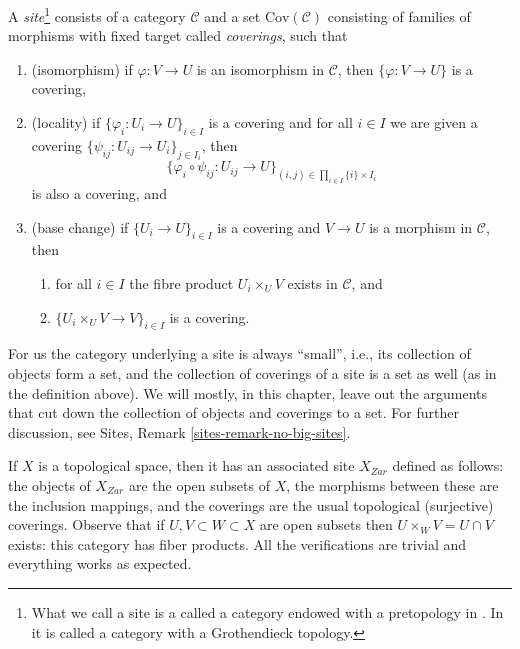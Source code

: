 \begin{definition}
\label{definition-site}
A {\it site}\footnote{What we call a site is a called a category endowed with
a pretopology in \cite[Expos\'e II, D\'efinition 1.3]{SGA4}.
In \cite{ArtinTopologies} it is called a category with a Grothendieck
topology.} consists of a category $\mathcal{C}$ and a set
$\text{Cov}(\mathcal{C})$ consisting of families of morphisms with fixed target
called {\it coverings}, such that
\begin{enumerate}
\item (isomorphism) if $\varphi : V \to U$ is an isomorphism in $\mathcal{C}$,
then $\{\varphi : V \to U\}$ is a covering,
\item (locality) if $\{\varphi_i : U_i \to U\}_{i\in I}$ is a covering and
for all $i \in I$ we are given a covering
$\{\psi_{ij} : U_{ij} \to U_i \}_{j\in I_i}$, then
$$
\{
\varphi_i \circ \psi_{ij} : U_{ij} \to U
\}_{(i, j)\in \prod_{i\in I} \{i\} \times I_i}
$$
is also a covering, and
\item (base change) if $\{U_i \to U\}_{i\in I}$
is a covering and $V \to U$ is a morphism in $\mathcal{C}$, then
\begin{enumerate}
\item for all $i \in I$ the fibre product
$U_i \times_U V$ exists in $\mathcal{C}$, and
\item $\{U_i \times_U V \to V\}_{i\in I}$ is a covering.
\end{enumerate}
\end{enumerate}
\end{definition}

\noindent
For us the category underlying a site is always ``small'', i.e., its
collection of objects form a set, and the collection of coverings of
a site is a set as well (as in the definition above). We will mostly,
in this chapter, leave out the arguments that cut down the collection
of objects and coverings to a set. For further discussion, see
Sites, Remark \ref{sites-remark-no-big-sites}.

\begin{example}
\label{example-site-topological-space}
If $X$ is a topological space, then it has an associated site $X_{Zar}$
defined as follows: the objects of $X_{Zar}$ are the open subsets of $X$,
the morphisms between these are the inclusion mappings, and the coverings are
the usual topological (surjective) coverings. Observe that if
$U, V \subset W \subset X$ are open subsets then $U \times_W V = U \cap V$
exists: this category has fiber products. All the verifications are trivial and
everything works as expected.
\end{example}




